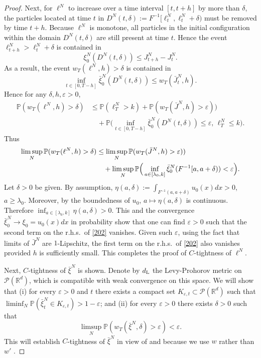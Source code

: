 \documentclass[11pt]{amsart}
\theoremstyle{plain}
\newcommand{\la}{\lambda}
\newcommand{\eps}{\varepsilon}
\newcommand{\del}{\delta}
\newcommand{\R}{{\mathbb R}}
\newcommand{\PP}{{\mathbb P}}
\newcommand{\calP}{{\mathcal P}}
\newcommand{\F}{F}
\begin{document}
\begin{proof}
Next, for $\ell^N$ to increase over a time interval $[t,t+h]$
by more than $\del$, the particles located at time $t$ in
$D^N(t,\del):=\F^{-1}[\ell^N_t,\ell^N_t+\del)$ must be removed by time $t+h$.
Because $\ell^N$ is monotone, all particles
in the initial configuration within the domain $D^N(t,\del)$
are still present at time $t$.
Hence the event $\ell^N_{t+h}>\ell^N_t+\del$
is contained in
\[
\xi^N_0(D^N(t,\del))\le J^N_{t+h}-J^N_t.
\]
As a result, the event $w_T(\ell^N,h)>\del$ is contained in
\[
\inf_{t\in[0,T-h]}\bar\xi^N_0(D^N(t,\del))\le w_T(\bar J^N_t,h).
\]
Hence for any $\del,h,\eps>0$,
\begin{align*}
\PP(w_T(\ell^N,h)>\del)
&\le\PP(\ell^N_T>k)+\PP(w_T(\bar J^N,h)>\eps))
\\
&\quad
+\PP\Big(\inf_{t\in[0,T-h]}\bar\xi^N_0(D^N(t,\del))\le\eps,\,\ell^N_T\le k\Big).
\end{align*}
Thus
\begin{align}\label{202}
\notag
\limsup_N\PP(w_T(\ell^N,h)>\del)
&\le
\limsup_N\PP(w_T(\bar J^N,h)>\eps))
\\
&\quad
+\limsup_N\PP\Big(\inf_{a\in[\la_0,k]}\bar\xi^N_0(\F^{-1}[a,a+\del))<\eps\Big).
\end{align}
Let $\del>0$ be given.
By assumption, $\eta(a,\del):=\int_{\F^{-1}(a,a+\del)} u_0(x)dx>0$,
$a\ge\la_0$.
Moreover, by the boundedness of $u_0$, $a\mapsto\eta(a,\del)$
is continuous. Therefore $\inf_{a\in[\la_0,k]}\eta(a,\del)>0$.
This and the convergence $\bar\xi^N_0\to\xi_0=u_0(x)dx$
in probability show that
one can find $\eps>0$ such that the second term on
the r.h.s.\ of \eqref{202} vanishes.
Given such $\eps$, using the fact that limits of $\bar J^N$ are $1$-Lipschitz,
the first term on the r.h.s.\ of \eqref{202} also vanishes provided
$h$ is sufficiently small. This completes the proof of $C$-tightness
of $\ell^N$.

Next, $C$-tightness of $\bar\xi^N$ is shown.
Denote by $d_{\rm L}$ the Levy-Prohorov metric on $\calP(\R^d)$,
which is compatible with weak convergence on this space. We will show that
(i) for every $\eps>0$ and $t$ there exists a compact set $K_{\eps,t}\subset\calP(\R^d)$
such that $\liminf_N\PP(\bar\xi^N_t\in K_{\eps,t})>1-\eps$;
and (ii)
for every $\eps>0$ there exists $\del>0$ such that
\[
\limsup_N \PP(w_T(\bar\xi^N,\del)>\eps)<\eps.
\]
This will establish $C$-tightness of $\bar\xi^N$ in view of
\cite[Corollary 3.7.4 (p.\ 129)]{ethkur} and because we use $w$ rather than $w'$
\cite[(3.6.2) (p.\ 122)]{ethkur}.


\end{proof}
\end{document}
